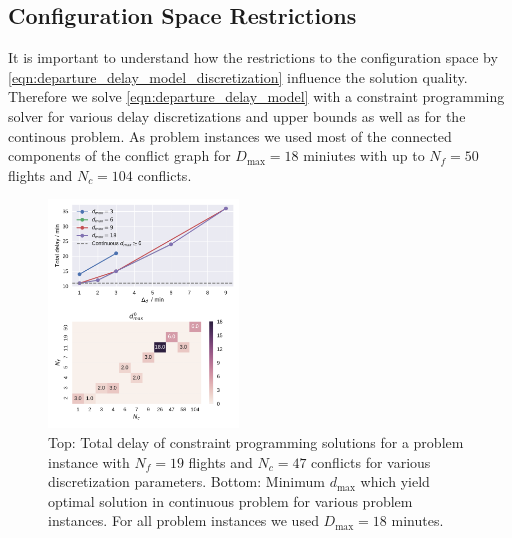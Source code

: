 \documentclass[aps,pra,twocolumn,10pt]{revtex4-1}
\begin{document}
\subsection{Configuration Space Restrictions}
It is important to understand how the restrictions to the configuration space by \eqref{eqn:departure_delay_model_discretization} influence the solution quality.
Therefore we solve \eqref{eqn:departure_delay_model} with a constraint programming solver \cite{numberjack} for various delay discretizations and upper bounds as well as for the continous problem.
As problem instances we used most of the connected components of the conflict graph for $D_\text{max}=18$ miniutes with up to $N_f=50$ flights and $N_c=104$ conflicts.
\begin{figure}[htpb]
    \centering
    \includegraphics[width=0.45\textwidth,natwidth=1,natheight=0]{./pics/delay_only_cp_results.pdf}
    \caption{Top: Total delay of constraint programming solutions for a problem instance with $N_f=19$ flights and $N_c=47$ conflicts for various discretization parameters.
    Bottom: Minimum $d_\text{max}$ which yield optimal solution in continuous problem for various problem instances. For all problem instances we used $D_\text{max}=18$ minutes.}
    \label{fig:delay_only_cp_results}
\end{figure}
\end{document}
